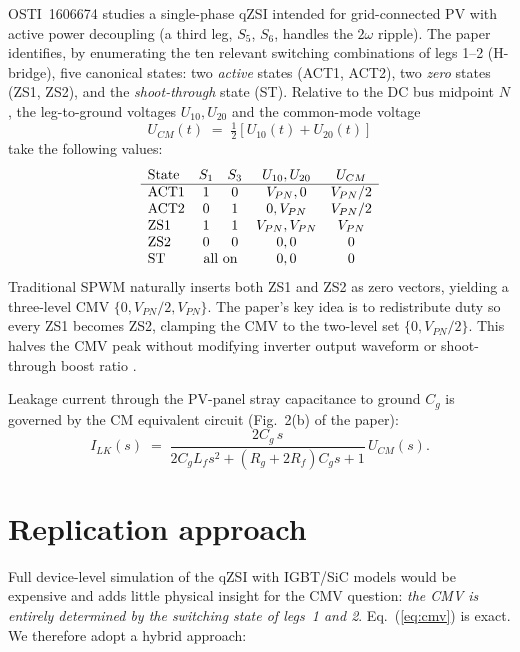 \documentclass[11pt]{article}
\begin{document}
OSTI~1606674 studies a single-phase qZSI intended for
grid-connected PV with active power decoupling (a third leg, $S_5$,
$S_6$, handles the $2\omega$ ripple).  The paper identifies, by
enumerating the ten relevant switching combinations of legs 1--2
(H-bridge), five canonical states: two \emph{active} states
(ACT1, ACT2), two \emph{zero} states (ZS1, ZS2), and the
\emph{shoot-through} state (ST).  Relative to the DC bus midpoint
\(N\), the leg-to-ground voltages $U_{10},U_{20}$ and the
common-mode voltage
\begin{equation}
  U_{CM}(t)\;=\;\tfrac{1}{2}\left[U_{10}(t)+U_{20}(t)\right]
  \label{eq:cmv}
\end{equation}
take the following values:
\[
\begin{array}{lcccc}
\text{State} & S_1 & S_3 & U_{10}, U_{20} & U_{CM}\\\hline
\text{ACT1} & 1 & 0 & V_{PN},0 & V_{PN}/2 \\
\text{ACT2} & 0 & 1 & 0,V_{PN} & V_{PN}/2 \\
\text{ZS1}  & 1 & 1 & V_{PN},V_{PN} & V_{PN}   \\
\text{ZS2}  & 0 & 0 & 0,0 & 0 \\
\text{ST}   & \multicolumn{2}{c}{\text{all on}} & 0,0 & 0 \\
\end{array}
\]
Traditional SPWM naturally inserts both ZS1 and ZS2 as zero
vectors, yielding a three-level CMV $\{0,V_{PN}/2,V_{PN}\}$.  The
paper's key idea is to redistribute duty so every ZS1 becomes
ZS2, clamping the CMV to the two-level set
$\{0,V_{PN}/2\}$.  This halves the CMV peak without modifying
inverter output waveform or shoot-through boost ratio
\cite{paper}.

Leakage current through the PV-panel stray capacitance to ground
$C_g$ is governed by the CM equivalent circuit (Fig.~2(b) of the
paper):
\begin{equation}
  I_{LK}(s) \;=\;
  \frac{2 C_g\,s}{2 C_g L_f s^2 + (R_g + 2R_f) C_g s + 1}\,U_{CM}(s).
  \label{eq:cmcct}
\end{equation}

\section{Replication approach}

Full device-level simulation of the qZSI with IGBT/SiC models
would be expensive and adds little physical insight for the CMV
question: \textit{the CMV is entirely determined by the switching
state of legs~1 and 2}.  Eq.~(\ref{eq:cmv}) is exact.  We therefore
adopt a hybrid approach:
\end{document}
